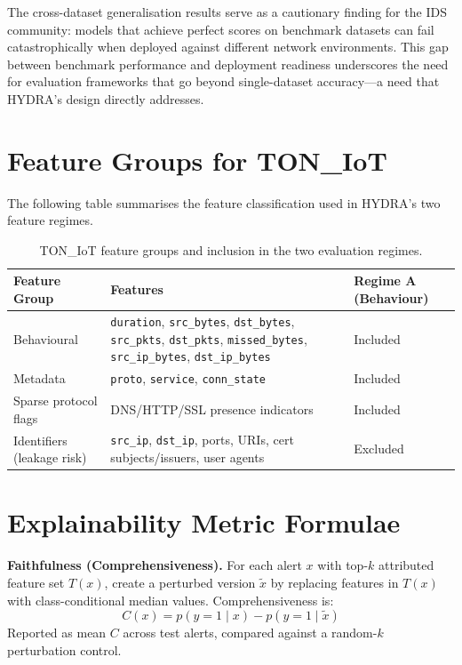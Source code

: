 \documentclass[12pt,a4paper]{report}
\begin{document}
The cross-dataset generalisation results serve as a cautionary finding for the IDS community: models that achieve perfect scores on benchmark datasets can fail catastrophically when deployed against different network environments. This gap between benchmark performance and deployment readiness underscores the need for evaluation frameworks that go beyond single-dataset accuracy---a need that HYDRA's design directly addresses.

\appendix

\chapter{Feature Groups for TON\_IoT}
\label{app:features}

The following table summarises the feature classification used in HYDRA's two feature regimes.

\begin{table}[H]
\centering
\caption{TON\_IoT feature groups and inclusion in the two evaluation regimes.}
\label{tab:features}
\begin{tabular}{p{3.5cm}p{6cm}p{3cm}}
\toprule
\textbf{Feature Group} & \textbf{Features} & \textbf{Regime A (Behaviour)} \\
\midrule
Behavioural & \texttt{duration}, \texttt{src\_bytes}, \texttt{dst\_bytes}, \texttt{src\_pkts}, \texttt{dst\_pkts}, \texttt{missed\_bytes}, \texttt{src\_ip\_bytes}, \texttt{dst\_ip\_bytes} & Included \\
\addlinespace
Metadata & \texttt{proto}, \texttt{service}, \texttt{conn\_state} & Included \\
\addlinespace
Sparse protocol flags & DNS/HTTP/SSL presence indicators & Included \\
\addlinespace
Identifiers (leakage risk) & \texttt{src\_ip}, \texttt{dst\_ip}, ports, URIs, cert subjects/issuers, user agents & Excluded \\
\bottomrule
\end{tabular}
\end{table}

\chapter{Explainability Metric Formulae}
\label{app:formulae}

\noindent\textbf{Faithfulness (Comprehensiveness).} For each alert $x$ with top-$k$ attributed feature set $T(x)$, create a perturbed version $\tilde{x}$ by replacing features in $T(x)$ with class-conditional median values. Comprehensiveness is:
\begin{equation}
C(x) = p(y=1 \mid x) - p(y=1 \mid \tilde{x})
\end{equation}
Reported as mean $C$ across test alerts, compared against a random-$k$ perturbation control.
\end{document}
